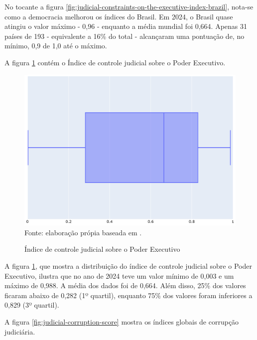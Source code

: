 No tocante a figura \ref{fig:judicial-constraints-on-the-executive-index-brazil}, nota-se como a democracia melhorou os índices do Brasil. Em 2024, o Brasil quase atingiu o valor máximo - 0,96 - enquanto a média mundial foi 0,664. Apenas 31 países de 193 - equivalente a 16\% do total - alcançaram uma pontuação de, no mínimo, 0,9 de 1,0 até o máximo.

A figura \ref{fig:quartis_controle_jus_sobre_gov} contém o Índice de controle judicial sobre o Poder Executivo.

\begin{figure}[H]
    \centering
    \caption{Índice de controle judicial sobre o Poder Executivo}
    \includegraphics[width=1\linewidth]{figuras/quartis_controle_jus_sobre_gov}
    \label{fig:quartis_controle_jus_sobre_gov}
    \footnotesize{Fonte: elaboração própia baseada em \cite{jus_constraints_on_gov}.}
\end{figure}

A figura \ref{fig:quartis_controle_jus_sobre_gov}, que mostra a distribuição do índice de controle judicial sobre o Poder Executivo, ilustra que no ano de 2024 teve um valor mínimo de 0,003 e um máximo de 0,988. A média dos dados foi de 0,664. Além disso, 25\% dos valores ficaram abaixo de 0,282 (1º quartil), enquanto 75\% dos valores foram inferiores a 0,829 (3º quartil).

A figura \ref{fig:judicial-corruption-score} mostra os índices globais de corrupção judiciária.

